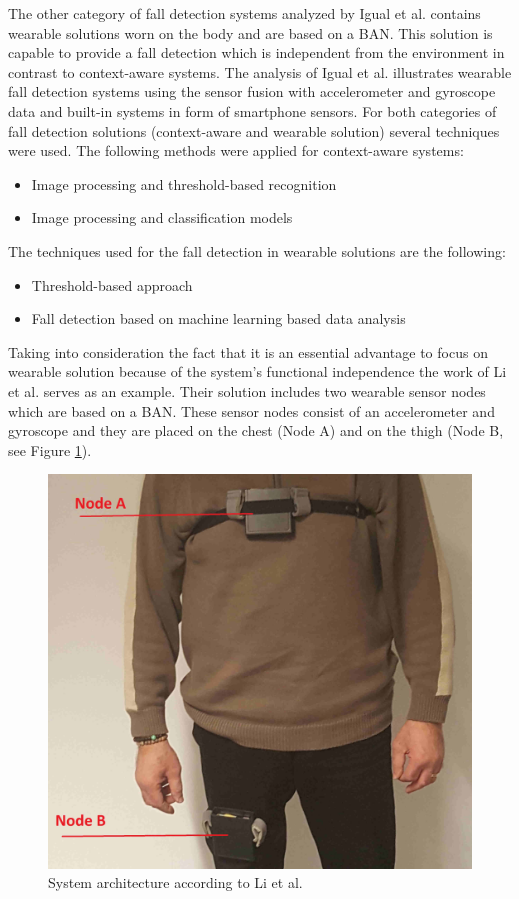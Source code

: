 \documentclass[10pt,journal,compsoc]{IEEEtran}
\begin{document}
The other category of fall detection systems analyzed by Igual et al. \cite{Igual2013} contains wearable solutions worn on the body and are based on a BAN. This solution is capable to provide a fall detection which is independent from the environment in contrast to context-aware systems. The analysis of Igual et al. \cite{Igual2013} illustrates wearable fall detection systems using the sensor fusion with accelerometer and gyroscope data and built-in systems in form of smartphone sensors. For both categories of fall detection solutions (context-aware and wearable solution) several techniques were used. The following methods were applied for context-aware systems:
\begin{itemize}
	\item Image processing and threshold-based recognition
	\item Image processing and classification models
\end{itemize} 
The techniques used for the fall detection in wearable solutions are the following:
\begin{itemize}
	\item Threshold-based approach
	\item Fall detection based on machine learning based data analysis
\end{itemize}
Taking into consideration the fact that it is an essential advantage to focus on wearable solution because of the system's functional independence the work of Li et al. \cite{Li2009} serves as an example. Their solution includes two wearable sensor nodes which are based on a BAN. These sensor nodes consist of an accelerometer and gyroscope and they are placed on the chest (Node A) and on the thigh (Node B, see Figure \ref{fig:LietAl-Architecture}). 
\begin{figure}[!ht] 
	\centering
	\includegraphics[scale=0.14]{Images/BasePrototype.png}
	\caption[System architecture according to Li et al.]{System architecture according to Li et al. \cite{Li2009}}
	\label{fig:LietAl-Architecture}
\end{figure}
\end{document}
